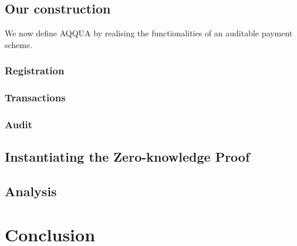 \documentclass[a4paper, thm-restate]{book}
\begin{document}
        \section{Our construction}\label{sec:scheme}
        We now define AQQUA by realising the functionalities of an auditable payment scheme.

        
        \subsection{Registration}
            
            
            
        \subsection{Transactions}  
            
            
            
            
            
        \subsection{Audit}
            
            
        
        \section{Instantiating the Zero-knowledge Proof}
        
        \section{Analysis}
            


    \chapter{Conclusion}
    

    \printbibliography
\end{document}
